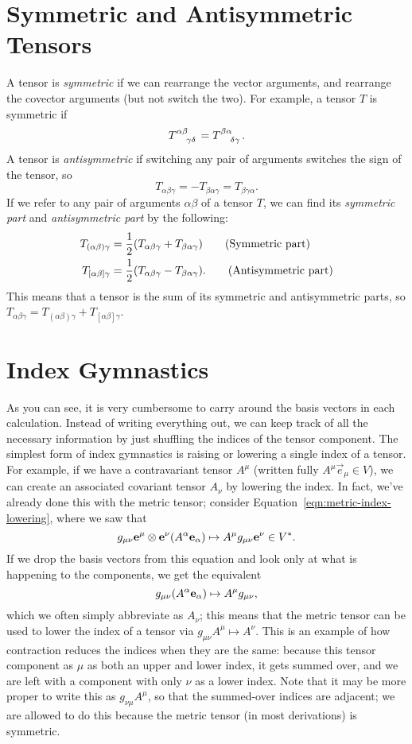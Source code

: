\section{Symmetric and Antisymmetric Tensors}
A tensor is \emph{symmetric} if we can rearrange the vector arguments, and rearrange the covector arguments (but not switch the two).
For example, a tensor $T$ is symmetric if
\[ \tensor{T}{^{\alpha\beta}_{\gamma\delta}} = \tensor{T}{^{\beta\alpha}_{\delta\gamma}}. \]
A tensor is \emph{antisymmetric} if switching any pair of arguments switches the sign of the tensor, so 
\[ T_{\alpha\beta\gamma} = -T_{\beta\alpha\gamma} = T_{\beta\gamma\alpha}. \]
If we refer to any pair of arguments $\alpha\beta$ of a tensor $T$, we can find its \emph{symmetric part} and \emph{antisymmetric part} by the following:
\begin{align*}
    T_{(\alpha\beta)\gamma} &= \frac{1}{2}\qty(T_{\alpha\beta\gamma} + T_{\beta\alpha\gamma}) \tag{Symmetric part} \\
    T_{[\alpha\beta]\gamma} &= \frac{1}{2}\qty(T_{\alpha\beta\gamma} - T_{\beta\alpha\gamma}). \tag{Antisymmetric part}
\end{align*}
This means that a tensor is the sum of its symmetric and antisymmetric parts, so $T_{\alpha\beta\gamma} = T_{(\alpha\beta)\gamma} + T_{[\alpha\beta]\gamma}$.

\section{Index Gymnastics}
As you can see, it is very cumbersome to carry around the basis vectors in each calculation.
Instead of writing everything out, we can keep track of all the necessary information by just shuffling the indices of the tensor component.
The simplest form of index gymnastics is raising or lowering a single index of a tensor.
For example, if we have a contravariant tensor $A^\mu$ (written fully $A^\mu \vec{e}_\mu \in V$), we can create an associated covariant tensor $A_\nu$ by lowering the index.
In fact, we've already done this with the metric tensor; consider Equation~\eqref{eqn:metric-index-lowering}, where we saw that
\[ g_{\mu\nu} \vb{e}^\mu \otimes \vb{e}^\nu \qty(A^\alpha \vb{e}_\alpha) \mapsto A^\mu g_{\mu\nu} \vb{e}^\nu \in V^*. \]
If we drop the basis vectors from this equation and look only at what is happening to the components, we get the equivalent 
\[ g_{\mu\nu}\qty(A^\alpha \vb{e}_\alpha) \mapsto A^\mu g_{\mu\nu}, \]
which we often simply abbreviate as $A_\nu$; this means that the metric tensor can be used to lower the index of a tensor via $g_{\mu\nu}A^\mu \mapsto A^\nu$.
This is an example of how contraction reduces the indices when they are the same: because this tensor component as $\mu$ as both an upper and lower index, it gets summed over, and we are left with a component with only $\nu$ as a lower index.
Note that it may be more proper to write this as $g_{\nu\mu}A^\mu$, so that the summed-over indices are adjacent; we are allowed to do this because the metric tensor (in most derivations) is symmetric.


